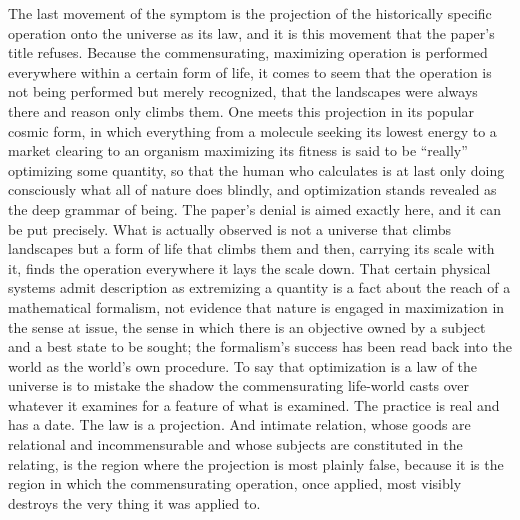 The last movement of the symptom is the projection of the historically specific operation onto the universe as its law, and it is this movement that the paper's title refuses. Because the commensurating, maximizing operation is performed everywhere within a certain form of life, it comes to seem that the operation is not being performed but merely recognized, that the landscapes were always there and reason only climbs them. One meets this projection in its popular cosmic form, in which everything from a molecule seeking its lowest energy to a market clearing to an organism maximizing its fitness is said to be ``really'' optimizing some quantity, so that the human who calculates is at last only doing consciously what all of nature does blindly, and optimization stands revealed as the deep grammar of being. The paper's denial is aimed exactly here, and it can be put precisely. What is actually observed is not a universe that climbs landscapes but a form of life that climbs them and then, carrying its scale with it, finds the operation everywhere it lays the scale down. That certain physical systems admit description as extremizing a quantity is a fact about the reach of a mathematical formalism, not evidence that nature is engaged in maximization in the sense at issue, the sense in which there is an objective owned by a subject and a best state to be sought; the formalism's success has been read back into the world as the world's own procedure. To say that optimization is a law of the universe is to mistake the shadow the commensurating life-world casts over whatever it examines for a feature of what is examined. The practice is real and has a date. The law is a projection. And intimate relation, whose goods are relational and incommensurable and whose subjects are constituted in the relating, is the region where the projection is most plainly false, because it is the region in which the commensurating operation, once applied, most visibly destroys the very thing it was applied to.

